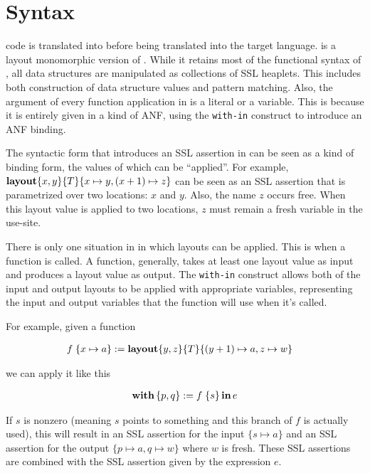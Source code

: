 \section{Syntax}

\Pika{} code is translated into \PikaCore{} before being translated into the target language. \PikaCore{}
is a layout monomorphic version of \Pika{}. While it retains most of the functional syntax of \Pika,
all data structures are manipulated as collections of SSL heaplets. This includes both construction
of data structure values and pattern matching. Also, the argument of every function application in
\PikaCore{} is a literal or a variable. This is because it is entirely given in a kind of ANF, using
the \verb|with-in| construct to introduce an ANF binding.

The syntactic form that introduces an SSL assertion in \PikaCore{} can be seen as a kind of binding
form, the values of which can be ``applied''. For example, $\textbf{layout}\{ x, y \}\{ T \}\{ x \mapsto y, (x+1) \mapsto z \}$
can be seen as an SSL assertion that is parametrized over two locations: $x$ and $y$. Also, the name
$z$ occurs free. When this layout value is applied to two locations, $z$ must remain a fresh variable in
the use-site.

There is only one situation in \PikaCore{} in which layouts can be applied. This is when a function
is called. A function, generally, takes at least one layout value as input and produces a layout value as
output. The \verb|with-in| construct allows both of the input and output layouts to be applied with
appropriate variables, representing the input and output variables that the function will use when
it's called.

For example, given a function

\begin{align*}
  &f\; \{ x \mapsto a \} := \textbf{layout}\{ y, z \}\{ T \}\{ (y+1) \mapsto a, z \mapsto w \}
\end{align*}

\noindent
we can apply it like this

\begin{align*}
  \textbf{with}\,\{p, q\} := f\; \{s\}\,\textbf{in}\, e
\end{align*}

\noindent
If $s$ is nonzero (meaning $s$ points to something and this branch of $f$ is actually used), this will result in an SSL assertion
for the input $\{s \mapsto a\}$ and an SSL assertion for the output $\{p \mapsto a, q \mapsto w\}$ where $w$ is fresh. These
SSL assertions are combined with the SSL assertion given by the expression $e$.

